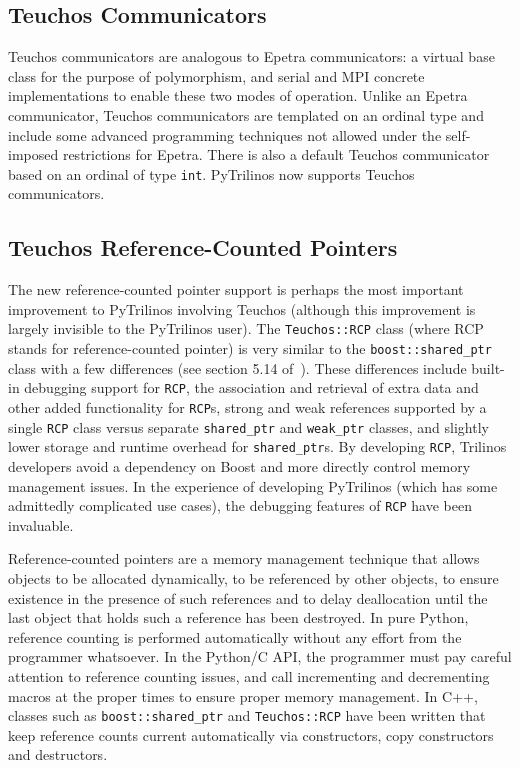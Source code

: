 \documentclass[11pt]{article}
\begin{document}
\subsection{Teuchos Communicators}
\label{sec:teuchos_communicators}

Teuchos communicators are analogous to Epetra communicators: a virtual base class for the purpose of polymorphism, and serial and MPI concrete implementations to enable these two modes of operation.  Unlike an Epetra communicator, Teuchos communicators are templated on an ordinal type and include some advanced programming techniques not allowed under the self-imposed restrictions for Epetra.  There is also a default Teuchos communicator based on an ordinal of type {\tt int}.  PyTrilinos now supports Teuchos communicators.

\subsection{Teuchos Reference-Counted Pointers}
\label{sec:teuchos_rcp}

The new reference-counted pointer support is perhaps the most important improvement to PyTrilinos involving Teuchos (although this improvement is largely invisible to the PyTrilinos user).  The {\tt Teuchos::RCP} class (where RCP stands for reference-counted pointer) is very similar to the {\tt boost::shared\_ptr} class with a few differences (see section 5.14 of~\cite{TeuchosMemMgt}).  These differences include built-in debugging support for {\tt RCP}, the association and retrieval of extra data and other added functionality for {\tt RCP}s, strong and weak references supported by a single {\tt RCP} class versus separate {\tt shared\_ptr} and {\tt weak\_ptr} classes, and slightly lower storage and runtime overhead for {\tt shared\_ptr}s. By developing {\tt RCP}, Trilinos developers avoid a dependency on Boost and more directly control memory management issues.  In the experience of developing PyTrilinos (which has some admittedly complicated use cases), the debugging features of {\tt RCP} have been invaluable.

Reference-counted pointers are a memory management technique that allows objects to be allocated dynamically, to be referenced by other objects, to ensure existence in the presence of such references and to delay deallocation until the last object that holds such a reference has been destroyed.  In pure Python, reference counting is performed automatically without any effort from the programmer whatsoever.  In the Python/C API, the programmer must pay careful attention to reference counting issues, and call incrementing and decrementing macros at the proper times to ensure proper memory management.  In C++, classes such as {\tt boost::shared\_ptr} and {\tt Teuchos::RCP} have been written that keep reference counts current automatically via constructors, copy constructors and destructors.
\end{document}
